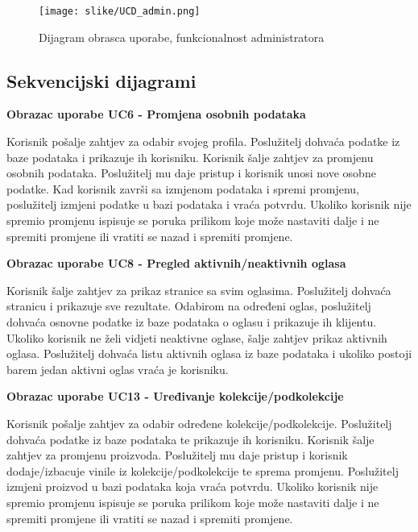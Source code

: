 				\begin{figure}[H]
					\texttt{[image: slike/UCD\_admin.png]}
					\centering
					\caption{Dijagram obrasca uporabe, funkcionalnost administratora}
					\label{fig:admin}
				\end{figure}

				\eject		
				
			\subsection{Sekvencijski dijagrami}
				
%				

				\textbf{Obrazac uporabe UC6 - Promjena osobnih podataka}
				
				\text Korisnik pošalje zahtjev za odabir svojeg profila. Poslužitelj dohvaća podatke iz baze podataka i prikazuje ih korisniku. Korisnik šalje zahtjev za promjenu osobnih podataka. Poslužitelj mu daje pristup i korisnik unosi nove osobne podatke. Kad korisnik završi sa izmjenom podataka i spremi promjenu, poslužitelj izmjeni podatke u bazi podataka i vraća potvrdu. Ukoliko korisnik nije spremio promjenu ispisuje se poruka prilikom koje može nastaviti dalje i ne spremiti promjene ili vratiti se nazad i spremiti promjene.
				
				
				\eject
				
				\textbf{Obrazac uporabe UC8 - Pregled aktivnih/neaktivnih oglasa}
				
				\text Korisnik šalje zahtjev za prikaz stranice sa svim oglasima. Poslužitelj dohvaća stranicu i prikazuje sve rezultate. Odabirom na određeni oglas, poslužitelj dohvaća osnovne podatke iz baze podataka o oglasu i prikazuje ih klijentu. Ukoliko korisnik ne želi vidjeti neaktivne oglase, šalje zahtjev prikaz aktivnih oglasa. Poslužitelj dohvaća listu aktivnih oglasa iz baze podataka i ukoliko postoji barem jedan aktivni oglas vraća je korisniku.
				
				
				\eject
				
				\textbf{Obrazac uporabe UC13 - Uređivanje kolekcije/podkolekcije}
				
				\text Korisnik pošalje zahtjev za odabir određene kolekcije/podkolekcije. Poslužitelj dohvaća podatke iz baze podataka te prikazuje ih korisniku. Korisnik šalje zahtjev za promjenu proizvoda. Poslužitelj mu daje pristup i korisnik dodaje/izbacuje vinile iz kolekcije/podkolekcije te sprema promjenu. Poslužitelj izmjeni proizvod u bazi podataka koja vraća potvrdu.  Ukoliko korisnik nije spremio promjenu ispisuje se poruka prilikom koje može nastaviti dalje i ne spremiti promjene ili vratiti se nazad i spremiti promjene.
				
